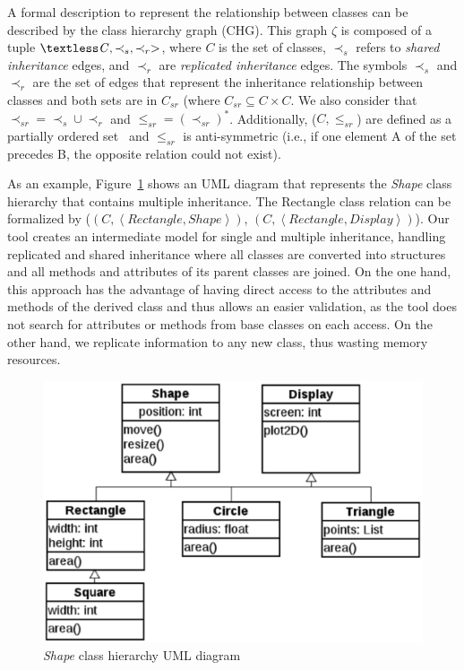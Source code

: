 \documentclass[conference]{IEEEtran}
\begin{document}
A formal description to represent
the relationship between classes can be described by the class hierarchy graph
(CHG). This graph $\zeta$ is composed of a tuple $\textless \mathit{C}, \prec_{s}, \prec_{r}>$,
where $\mathit{C}$ is the set of classes, $\prec_s $ refers to \textit{shared inheritance} edges,
and $\prec_r$ are \textit{replicated inheritance} edges. The symbols $\prec_{s}$ and $\prec_{r}$
are the set of edges that represent the inheritance relationship between
classes and both sets are in $\mathit{C_{sr}}$ (where $\mathit{C_{sr}} \subseteq \mathit{C} \times \mathit{C}$.
We also consider that $\prec_{sr} = \prec_s \cup \prec_r$ and $\leq_{sr} = (\prec_{sr})^*$.
Additionally, ($\mathit{C}, \leq_{sr}$) are defined as a partially ordered set~\cite{Neggers99}
and $\leq_{sr}$ is anti-symmetric (i.e., if one element A of the set precedes B,
the opposite relation could not exist).

As an example, Figure~\ref{figure:uml_diagram} shows an UML diagram
that represents the \textit{Shape} class hierarchy that contains multiple inheritance.
The Rectangle class relation can be formalized by
($\left(C, \left\langle Rectangle, Shape \right\rangle \right)$,
$\left(C, \left\langle Rectangle, Display \right\rangle \right)$).
Our tool creates an intermediate model for single and multiple inheritance, handling
replicated and shared inheritance where all classes are converted into structures and all
methods and attributes of its parent classes are joined. On the one hand, this approach has
the advantage of having direct access to the attributes and methods
of the derived class and thus allows an easier validation, as the tool
does not search for attributes or methods from base classes on each access.
On the other hand, we replicate information to any new class, thus wasting
memory resources.


\begin{figure}[ht]
\centering
\includegraphics[scale=0.28]{figures/inheritance_uml}
\caption{\textit{Shape} class hierarchy UML diagram}
\label{figure:uml_diagram}
\end{figure}
\end{document}
